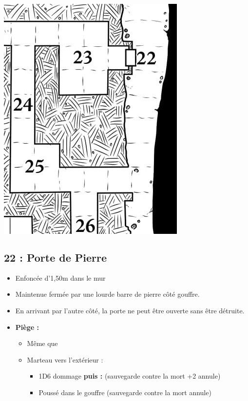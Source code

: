 \vfill
\pagebreak
\includegraphics[width=\columnwidth]{pics/map_22-25.jpg}
\subsection{22 : Porte de Pierre}\label{n3:s22}
\begin{itemize}
  \item Enfoncée d’1,50m dans le mur
  \item Maintenue fermée par une lourde barre de pierre côté gouffre. 
  \item En arrivant par l’autre côté, la porte ne peut être ouverte sans être détruite.
  \item \textbf{Piège :}
  \begin{itemize}
    \item Même que 
    \item Marteau vers l’extérieur :
    \begin{itemize}
      \item 1D6 dommage \textbf{puis :} (sauvegarde contre la mort +2 annule) 
      \item Poussé dans le gouffre (sauvegarde contre la mort annule)
    \end{itemize}
  \end{itemize}
\end{itemize}


